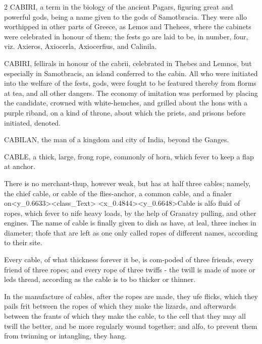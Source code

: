 \documentclass[10pt]{article}
\begin{document}
\begin{multicols}{2}
CABIRI, a term in the biology of the ancient Pagars, figuring great and powerful gods, being a name given to the gods of Samotbracia. They were allo worthipped in other parts of Greece, as Lemos and Thehees, where the cabinets were celebrated in honour of them; the fests go are laid to be, in number, four, viz. Axieros, Axiocerla, Axiocerfius, and Calinila.

CABIRI, fellirals in honour of the cabrii, celebrated in Thebes and Lemnos, but especially in Samotbracis, an island conferred to the cabin. All who were initiated into the welfare of the fests, gods, were fought to be featured thereby from florms at tea, and all other dangers. The economy of imitation was performed by placing the candidate, crowned with white-hemches, and grilled about the hons with a purple riband, on a kind of throne, about which the priets, and prisons before initiated, denoted.

CABILAN, the man of a kingdom and city of India, beyond the Ganges.

CABLE, a thick, large, frong rope, commonly of horn, which fever to keep a flap at anchor.

There is no merchant-thup, however weak, but has at half three cables; namely, the chief cable, or cable of the flies-anchor, a common cable, and a finaler on\textless{}y\_0.6633\textgreater{}\textless{}class\_Text\textgreater{} \textless{}x\_0.4844\textgreater{}\textless{}y\_0.6648\textgreater{}Cable is alfo fluid of ropes, which fever to nife heavy loads, by the help of Granatry pulling, and other engines. The name of cable is finally given to dish as have, at leal, three inches in diameter; thofe that are left as one only called ropes of different names, according to their site.

Every cable, of what thickness forever it be, is com-poded of three friends, every friend of three ropes; and every rope of three twiffs - the twill is made of more or leds thread, according as the cable is to bo thicker or thinner.

In the manufacture of cables, after the ropes are made, they ufe flicks, which they pails frit between the ropes of which they make the lizards, and afterwards between the frants of which they make the cable, to the cell that they may all twill the better, and be more regularly wound together; and alfo, to prevent them from twinning or intangling, they hang.

\end{multicols}
\end{document}
